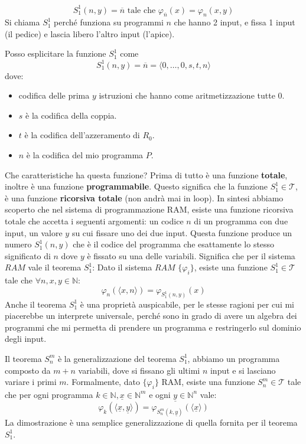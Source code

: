 \documentclass{article}
\begin{document}
\begin{enumerate}
          $$S_1^1(n,y)=\overline{n}\text{ tale che }\varphi_{\overline{n}}(x)=\varphi_n(x,y)$$
          Si chiama $S^1_1$ perché funziona su programmi $n$ che hanno 2 input, e fissa 1 input (il
          pedice) e lascia libero l'altro input (l'apice).

          Posso esplicitare la funzione $S_1^1$ come
          $$S_1^1(n,y)=\overline{n}=\langle 0,\dots,0,s,t,n\rangle$$
          dove:
          \begin{itemize}
              \item codifica delle prima $y$ istruzioni che hanno come aritmetizzazione tutte 0.
              \item $s$ è la codifica della coppia.
              \item $t$ è la codifica dell'azzeramento di $R_0$.
              \item $n$ è la codifica del mio programma $P$.
          \end{itemize}
          Che caratteristiche ha questa funzione? Prima di tutto è una funzione \textbf{totale}, inoltre
          è una funzione \textbf{programmabile}. Questo significa che la funzione $S_1^1\in\mathcal{T}$,
          è una funzione \textbf{ricorsiva totale} (non andrà mai in loop). In sintesi
          abbiamo scoperto che nel sistema di programmazione RAM, esiste una funzione ricorsiva totale che
          accetta i seguenti argomenti: un codice $n$ di un programma con due input, un valore $y$ su cui
          fissare uno dei due input. Questa funzione produce un numero $S_1^1(n,y)$ che è il codice del
          programma che esattamente lo stesso significato di $n$ dove $y$ è fissato su una delle variabili.
          Significa che per il sistema $RAM$ vale il teorema $S_1^1$: Dato il sistema $RAM$ $\{\varphi_i\}$,
          esiste una funzione $S_1^1\in\mathcal{T}$ tale che $\forall n,x,y\in\mathbb{N}$:
          $$\varphi_n\left(\langle x,n\rangle\right)=\varphi_{S_1^1(n,y)}(x)$$
          Anche il teorema $S_1^1$ è una proprietà auspicabile, per le stesse ragioni per cui mi piacerebbe
          un interprete universale, perché sono in grado di avere un algebra dei programmi che mi permetta di
          prendere un programma e restringerlo sul dominio degli input.

          Il teorema $S_n^m$ è la generalizzazione del teorema $S_1^1$, abbiamo un programma composto da
          $m+n$ variabili, dove si fissano gli ultimi $n$ input e si lasciano variare i primi $m$.
          Formalmente, dato $\{\varphi_i\}$ RAM, esiste una funzione $S_n^m\in\mathcal{T}$ tale che per
          ogni programma $k\in\mathbb{N},\underline{x}\in\mathbb{N}^m$ e ogni $\underline{y}\in\mathbb{N}^n$ vale:
          $$\varphi_k\left(\langle\underline{x},\underline{y}\rangle\right)=\varphi_{S_n^m(k,\underline{y})}\left(\langle\underline{x}\rangle\right)$$
          La dimostrazione è una semplice generalizzazione di quella fornita per il teorema $S_1^1$.
\end{enumerate}
\end{document}
